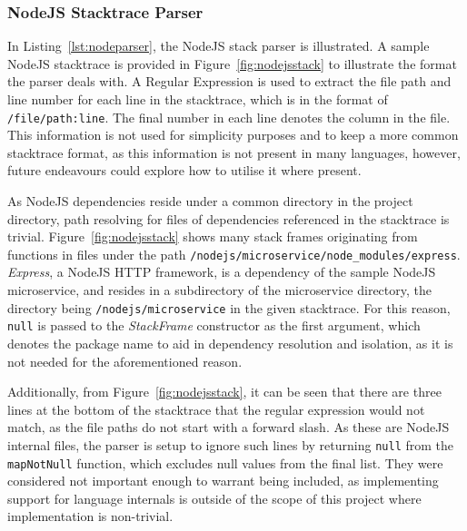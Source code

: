\documentclass[12pt,pdftex,titlepage]{report}
\begin{document}
                \subsubsection{NodeJS Stacktrace Parser}
                    In Listing~\ref{lst:nodeparser}, the NodeJS stack parser is illustrated. A sample NodeJS stacktrace is provided in Figure~\ref{fig:nodejsstack} to illustrate the
                    format the parser deals with. A Regular Expression is used to extract the file path and line number for each line
                    in the stacktrace, which is in the format of \texttt{/file/path:line}. The final number in each line denotes the column in the file. This information is not 
                    used for simplicity purposes and to keep a more common stacktrace format, as this information is not present in many languages, however, future endeavours could
                    explore how to utilise it where present.
                    
                    As NodeJS dependencies reside under a common directory in the project directory, path resolving for files of dependencies referenced in the stacktrace is trivial. 
                    Figure~\ref{fig:nodejsstack} shows many stack frames originating from functions in files under the path \texttt{/nodejs/microservice/node\_modules/express}. \textit{Express},
                    a NodeJS HTTP framework, is a dependency of the sample NodeJS microservice, and resides in a subdirectory of the microservice directory, the directory being \texttt{/nodejs/microservice}
                    in the given stacktrace. For this reason, \texttt{null} is passed to the \textit{StackFrame} constructor as the first argument, which denotes the package name to aid in
                    dependency resolution and isolation, as it is not needed for the aforementioned reason.

                    Additionally, from Figure~\ref{fig:nodejsstack}, it can be seen that there are three lines at the bottom of the stacktrace that the regular expression would not match, as the file
                    paths do not start with a forward slash. As these are NodeJS internal files, the parser is setup to ignore such lines by returning \texttt{null} from the \texttt{mapNotNull} function,
                    which excludes null values from the final list. They were considered not important enough to warrant being included, as implementing support for language internals is outside of the scope
                    of this project where implementation is non-trivial.%
\end{document}
